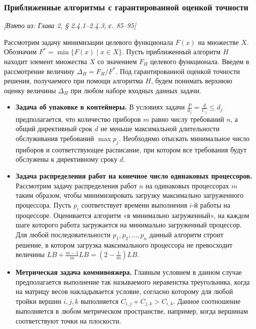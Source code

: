 \documentclass[a4paper,12pt]{article}
\begin{document}
\subsubsection*{Приближенные алгоритмы с гарантированной оценкой точности}
\textit{[Взято из: Глава 2, § 2.4.1–2.4.3, с. 85–95]}

Рассмотрим задачу минимизации целевого функционала \(F(x)\) на множестве \(X\). Обозначим \(F^* = \min \{F(x) \mid x \in X\}\). Пусть приближенный алгоритм \(H\) находит элемент множества \(X\) со значением \(F_H\) целевого функционала. Введем в рассмотрение величину \(\Delta_H = F_H / F^*\). Под гарантированной оценкой точности решения, получаемого при помощи алгоритма \(H\), будем понимать верхнюю оценку величины \(\Delta_H\) при любом наборе входных данных задачи.

\begin{itemize}
    \item \textbf{Задача об упаковке в контейнеры.} В условиях задачи \(\frac{P}{d_j} = \frac{d}{C_j} \le d_j\) предполагается, что количество приборов \(m\) равно числу требований \(n\), а общий директивный срок \(d\) не меньше максимальной длительности обслуживания требований \(\max p_j\). Необходимо отыскать минимальное число приборов и соответствующее расписание, при котором все требования будут обслужены к директивному сроку \(d\).
    \item \textbf{Задача распределения работ на конечное число одинаковых процессоров.} Рассмотрим задачу распределения работ \(n\) на одинаковых процессорах \(m\) таким образом, чтобы минимизировать загрузку максимально загруженного процессора. Пусть \(p_i\) соответствует времени выполнения \(i\)-й работы на процессоре. Оценивается алгоритм «в минимально загруженный», на каждом шаге которого работа загружается на минимально загруженный процессор. Для любой последовательности \(p_1, p_2, \dots, p_n\) данный алгоритм строит решение, в котором загрузка максимального процессора не превосходит величины \(LB + \frac{m-1}{m}LB = (2 - \frac{1}{m})LB\).
    \item \textbf{Метрическая задача коммивояжера.} Главным условием в данном случае предполагается выполнение так называемого неравенства треугольника, когда на матрицу весов накладывается условие, согласно которому для любой тройки вершин \(i, j, k\) выполняется \(C_{i,j} + C_{j,k} > C_{i,k}\). Данное соотношение выполняется в любом метрическом пространстве, например, когда вершинам соответствуют точки на плоскости.
\end{itemize}
\end{document}

